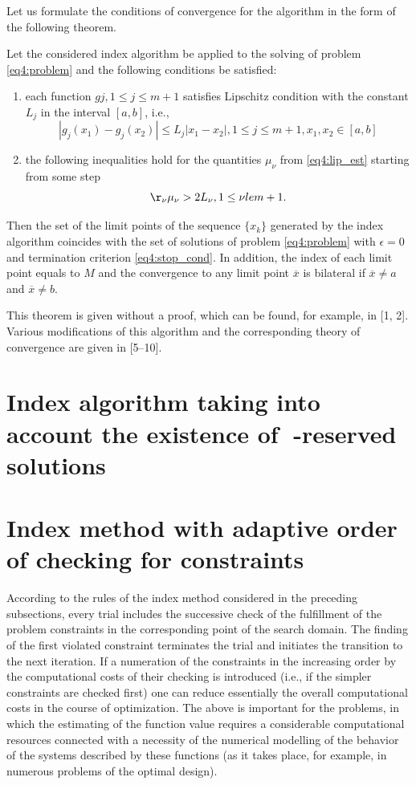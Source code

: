 \documentclass[graybox]{svmult}
\begin{document}
Let us formulate the conditions of convergence for the algorithm in the form of the following theorem.
\begin{theorem}
Let the considered index algorithm be applied to the solving of problem \eqref{eq4:problem} and the following conditions be satisfied:
\begin{enumerate}
  \item each function $gj, 1\le j\le m+1$ satisfies Lipschitz condition with the constant $L_j$ in the interval $[a,b]$, i.e.,
  \[
  |g_j(x_1)-g_j(x_2)|\le L_j|x_1-x_2|,1\le j\le m+1,x_1,x_2 \in[a,b]
  \]
  \item the following inequalities hold for the quantities $\mu_\nu$ from \eqref{eq4:lip_est} starting from some step
  \[
  \r_\nu\mu_\nu > 2L_\nu,1\le\nu\\le m+1.
  \]
\end{enumerate}

Then the set of the limit points of the sequence $\{x_k\}$ generated by the index algorithm coincides with the set of solutions of problem \eqref{eq4:problem} with $\epsilon=0$ and termination criterion \eqref{eq4:stop_cond}. In addition, the index of each limit point equals to $M$ and the convergence to any limit point $\overline{x}$  is bilateral if $\overline{x}\not=a$ and $\overline{x}\not=b$.
\end{theorem}

This theorem is given without a proof, which can be found, for example, in \cite{}[1, 2]. Various modifications of this algorithm and the corresponding theory of convergence are given in \cite{}[5–10].

\section{Index algorithm taking into account the existence of -reserved solutions}

\section*{Index method with adaptive order of checking for constraints}
According to the rules of the index method considered in the preceding subsections, every trial includes the successive check of the fulfillment of the problem constraints in the corresponding point of the search domain. The finding of the first violated constraint terminates the trial and initiates the transition to the next iteration. If a numeration of the constraints in the increasing order by the computational costs of their checking is introduced (i.e., if the simpler constraints are checked first) one can reduce essentially the overall computational costs in the course of optimization. The above is important for the problems, in which the estimating of the function value requires a considerable computational resources connected with a necessity of the numerical modelling of the behavior of the systems described by these functions (as it takes place, for example, in numerous problems of the optimal design).
\end{document}
